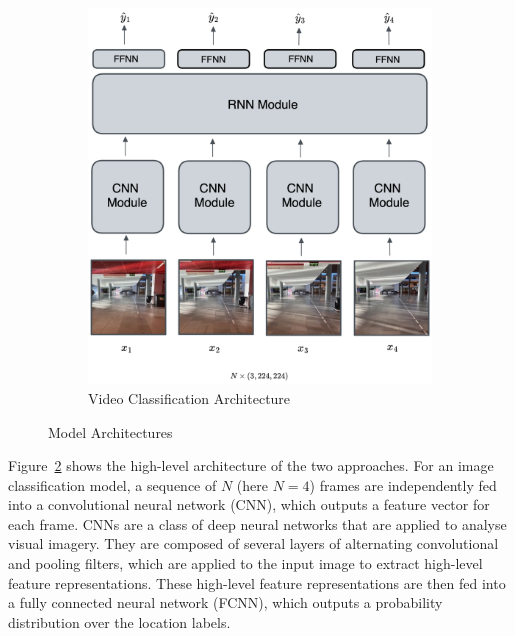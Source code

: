 \documentclass[a4paper]{article}
\begin{document}
\begin{figure}[ht]
\begin{subfigure}[b]{0.42\linewidth}
      \includegraphics[width=\linewidth]{figures/rnn-architecture.png}
      \caption{Video Classification Architecture}
      \label{fig:rnn-architecture}
    \end{subfigure}
    \caption{Model Architectures}
    \label{fig:model-architectures}
  \end{figure}

  Figure~\ref{fig:model-architectures} shows the high-level architecture of the two
  approaches. For an image classification model, a sequence of $N$ (here $N=4$)
  frames are independently fed into a convolutional neural network (CNN), which
  outputs a feature vector for each frame. CNNs are a class of deep neural
  networks that are applied to analyse visual imagery. They are composed of
  several layers of alternating convolutional and pooling filters, which are
  applied to the input image to extract high-level feature representations.
  These high-level feature representations are then fed into a fully connected
  neural network (FCNN), which outputs a probability distribution over the
  location labels.
\end{document}
